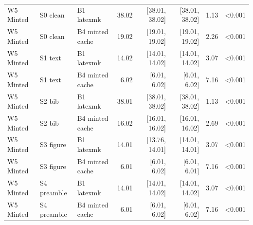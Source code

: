 \begin{table}[p]
{\begin{tabular}{lllrrrrr}
W5 Minted & S0 clean & B1 latexmk & 38.02 & [38.01, 38.02] & [38.01, 38.02] & 1.13 & <0.001 \\
W5 Minted & S0 clean & B4 minted cache & 19.02 & [19.01, 19.02] & [19.01, 19.02] & 2.26 & <0.001 \\
W5 Minted & S1 text & B1 latexmk & 14.02 & [14.01, 14.02] & [14.01, 14.02] & 3.07 & <0.001 \\
W5 Minted & S1 text & B4 minted cache & 6.02 & [6.01, 6.02] & [6.01, 6.02] & 7.16 & <0.001 \\
W5 Minted & S2 bib & B1 latexmk & 38.01 & [38.01, 38.02] & [38.01, 38.02] & 1.13 & <0.001 \\
W5 Minted & S2 bib & B4 minted cache & 16.02 & [16.01, 16.02] & [16.01, 16.02] & 2.69 & <0.001 \\
W5 Minted & S3 figure & B1 latexmk & 14.01 & [13.76, 14.01] & [14.01, 14.01] & 3.07 & <0.001 \\
W5 Minted & S3 figure & B4 minted cache & 6.01 & [6.01, 6.02] & [6.01, 6.01] & 7.16 & <0.001 \\
W5 Minted & S4 preamble & B1 latexmk & 14.01 & [14.01, 14.02] & [14.01, 14.02] & 3.07 & <0.001 \\
W5 Minted & S4 preamble & B4 minted cache & 6.01 & [6.01, 6.02] & [6.01, 6.02] & 7.16 & <0.001 \\
\bottomrule
\end{tabular}
}
\end{table}
